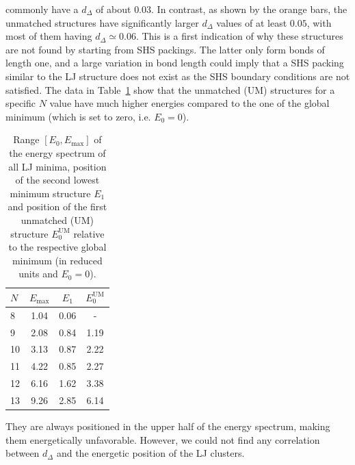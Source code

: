 commonly have a $d_\Delta$ of about $0.03$.  In contrast, as shown by the
orange bars, the unmatched structures have significantly larger $d_\Delta$
values of at least $0.05$, with most of them having $d_{\Delta} \simeq 0.06$.
This is a first indication of why these structures are not found by starting
from \ac{SHS} packings. The latter only form bonds of length one, and a large
variation in bond length could imply that a \ac{SHS} packing similar to the LJ
structure does not exist as the \ac{SHS} boundary conditions are not satisfied.  The
data in Table~\ref{tab:energies} show that the unmatched (UM) structures for a
specific $N$ value have much higher energies compared to the one of the global
minimum (which is set to zero, i.e.  $E_0=0$). %
%
\begin{table}\centering
    \caption{Range $[E_0,E_\text{max}]$ of the energy spectrum of all LJ
    minima, position of the second lowest minimum structure $E_1$ and position
    of the first unmatched (UM) structure $E_0^\text{UM}$ relative to the
    respective global minimum (in reduced units and $E_0=0$).}
    \label{tab:energies}
        \begin{tabular}{lccc}\toprule
        $N$ & $E_\text{max}$ & $E_1$ & $E_0^\text{UM}$ \\\midrule
        8   & 1.04   & 0.06    & -           \\
        9   & 2.08   & 0.84    & 1.19        \\
        10  & 3.13   & 0.87    & 2.22        \\
        11  & 4.22   & 0.85    & 2.27        \\
        12  & 6.16   & 1.62    & 3.38        \\
        13  & 9.26   & 2.85    & 6.14        \\\bottomrule
        \end{tabular}
\end{table}%
%
They are always positioned in the upper half of the energy spectrum, making
them energetically unfavorable.  However, we could not find any correlation
between $d_\Delta$ and the energetic position of the LJ clusters.

